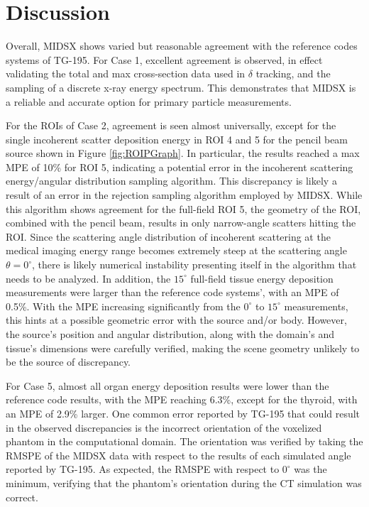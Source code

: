 \newpage
\section{Discussion}
\par Overall, MIDSX shows varied but reasonable agreement with the reference codes systems of TG-195. For Case 1, excellent agreement is observed, in effect validating the total and max cross-section data used in $\delta$ tracking, and the sampling of a discrete x-ray energy spectrum. This demonstrates that MIDSX is a reliable and accurate option for primary particle measurements.

\par For the ROIs of Case 2, agreement is seen almost universally, except for the single incoherent scatter deposition energy in ROI 4 and 5 for the pencil beam source shown in Figure \ref{fig:ROIPGraph}. In particular, the results reached a max MPE of 10\% for ROI 5, indicating a potential error in the incoherent scattering energy/angular distribution sampling algorithm. This discrepancy is likely a result of an error in the rejection sampling algorithm employed by MIDSX. While this algorithm shows agreement for the full-field ROI 5, the geometry of the ROI, combined with the pencil beam, results in only narrow-angle scatters hitting the ROI. Since the scattering angle distribution of incoherent scattering at the medical imaging energy range becomes extremely steep at the scattering angle $\theta = 0^\circ$, there is likely numerical instability presenting itself in the algorithm that needs to be analyzed. In addition, the $15^\circ$ full-field tissue energy deposition measurements were larger than the reference code systems', with an MPE of 0.5\%. With the MPE increasing significantly from the $0^\circ$ to $15^\circ$ measurements, this hints at a possible geometric error with the source and/or body. However, the source's position and angular distribution, along with the domain's and tissue's dimensions were carefully verified, making the scene geometry unlikely to be the source of discrepancy.

\par For Case 5, almost all organ energy deposition results were lower than the reference code results, with the MPE reaching 6.3\%, except for the thyroid, with an MPE of 2.9\% larger. One common error reported by TG-195 that could result in the observed discrepancies is the incorrect orientation of the voxelized phantom in the computational domain. The orientation was verified by taking the RMSPE of the MIDSX data with respect to the results of each simulated angle reported by TG-195. As expected, the RMSPE with respect to $0^\circ$ was the minimum, verifying that the phantom's orientation during the CT simulation was correct.

